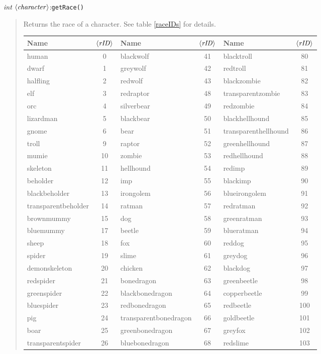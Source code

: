 \documentclass[a4paper,10pt,makeidx]{scrreprt}
\newcommand{\com}[2]{\index{#1}\texttt{#1(}#2\texttt{)}}
\newcommand{\var}[1]{$\left\langle \text{\emph{#1}} \right\rangle$}
\newcommand{\integer}{\textsl{int }}
\begin{document}
\integer \var{character}:\com{getRace}{}
\begin{quote}
       Returns the race of a character. See table \ref{raceIDs} for details.
       \begin{table}
\begin{tabular}{lc|lc|lc}
    Name & \var{rID} & Name & \var{rID} & Name & \var{rID}  \\ \hline
    human & 0 & blackwolf & 41 & blacktroll & 80\\
    dwarf & 1 & greywolf & 42 & redtroll & 81\\
    halfling & 2 & redwolf & 43 & blackzombie & 82\\
    elf & 3 & redraptor & 48 & transparentzombie & 83\\
    orc & 4 & silverbear & 49 & redzombie & 84\\
    lizardman & 5 & blackbear & 50 & blackhellhound & 85\\
    gnome & 6 & bear & 51 & transparenthellhound & 86\\
    troll & 9 & raptor & 52 & greenhellhound & 87\\
    mumie & 10 & zombie & 53 & redhellhound & 88\\
    skeleton & 11 & hellhound & 54 & redimp & 89\\
    beholder & 12 & imp & 55 & blackimp & 90\\
    blackbeholder & 13 & irongolem & 56 & blueirongolem & 91\\
    transparentbeholder & 14 & ratman & 57 & redratman & 92\\
    brownmummy & 15 & dog & 58 & greenratman & 93\\
    bluemummy & 17 & beetle & 59 & blueratman & 94\\
    sheep & 18 & fox & 60 & reddog & 95\\
    spider & 19 & slime & 61 & greydog & 96\\
    demonskeleton & 20 & chicken & 62 & blackdog & 97\\
    redspider & 21 & bonedragon & 63 & greenbeetle & 98\\
    greenspider & 22 & blackbonedragon & 64 & copperbeetle & 99\\
    bluespider & 23 & redbonedragon & 65 & redbeetle & 100\\
    pig & 24 & transparentbonedragon & 66 & goldbeetle & 101\\
    boar & 25 & greenbonedragon & 67 & greyfox & 102\\
    transparentspider & 26 & bluebonedragon & 68 & redslime & 103\\

\end{tabular}
\end{table}
\end{quote}
\end{document}
